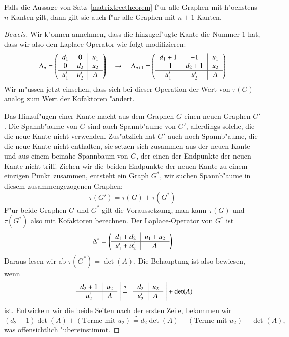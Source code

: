 \begin{hilfssatz}
\label{matrixtreetheoremstep}
Falls die Aussage von Satz~\ref{matrixtreetheorem}
f"ur alle Graphen mit h"ochstens $n$ Kanten
gilt, dann gilt sie auch f"ur alle Graphen mit $n+1$ Kanten.
\end{hilfssatz}

\begin{proof}[Beweis]
Wir k"onnen annehmen, dass die hinzugef"ugte Kante die Nummer $1$
hat, dass wir also den Laplace-Operator wie folgt modifizieren:
\[
\Delta_n
=
\left(\begin{tabular}{>{$}c<{$}>{$}c<{$}|>{$}c<{$}>{$}c<{$}}
d_1   &    0&u_1\\
    0 &d_2  &u_2\\
\hline
 u_1^t&u_2^t&A
\end{tabular}
\right)
\quad
\rightarrow
\quad
\Delta_{n+1}
=
\left(\begin{tabular}{>{$}c<{$}>{$}c<{$}|>{$}c<{$}>{$}c<{$}}
d_1+1 &   -1&u_1\\
   -1 &d_2+1&u_2\\
\hline
u_1^t &u_2^t&A
\end{tabular}
\right)
\]
Wir m"ussen jetzt einsehen, dass sich bei dieser Operation
der Wert von $\tau(G)$ analog zum Wert der Kofaktoren "andert.

Das Hinzuf"ugen einer Kante macht aus dem Graphen $G$ einen neuen
Graphen $G'$. Die Spannb"aume von $G$ sind auch Spannb"aume von $G'$,
allerdings solche, die die neue Kante nicht verwenden. Zus"atzlich
hat $G'$ auch noch Spannb"aume, die die neue Kante nicht enthalten,
sie setzen sich zusammen aus der neuen Kante und aus einem beinahe-Spannbaum
von $G$, der einen der Endpunkte der neuen Kante nicht triff. 
Ziehen wir die beiden Endpunkte der neuen Kante zu einem einzigen
Punkt zusammen, entsteht ein Graph $G^*$, wir suchen Spannb"aume in 
diesem zusammengezogenen Graphen:
\[
\tau(G')=\tau(G)+\tau(G^*)
\]
F"ur beide Graphen $G$ und $G^*$ gilt die Voraussetzung, man kann
$\tau(G)$ und $\tau(G^*)$ also mit Kofaktoren berechnen. Der Laplace-Operator
von $G^*$ ist
\[
\Delta^*
=
\left(\begin{tabular}{>{$}c<{$}|>{$}c<{$}>{$}c<{$}}
d_1+d_2&u_1+u_2\\
\hline
u_1^t +u_2^t&A
\end{tabular}
\right)
\]
Daraus lesen wir ab $\tau(G^*)=\det(A)$.
Die Behauptung ist also bewiesen, wenn
\[
\left|\;\begin{tabular}{>{$}c<{$}|>{$}c<{$}>{$}c<{$}}
d_2+1&u_2\\
\hline
u_2^t&A
\end{tabular}
\;
\right|
\overset{?}{=}
\left|\;\begin{tabular}{>{$}c<{$}|>{$}c<{$}>{$}c<{$}}
d_2  &u_2\\
\hline
u_2^t&A
\end{tabular}
\;
\right|
+\det(A)
\]
ist.
Entwickeln wir die beide Seiten nach der ersten Zeile, bekommen
wir 
\[
(d_2+1)\det(A)+(\text{Terme mit $u_2$})
\overset{?}{=}
d_2\det(A)+(\text{Terme mit $u_2$})+\det(A),
\]
was offensichtlich "ubereinstimmt.


\end{proof}
